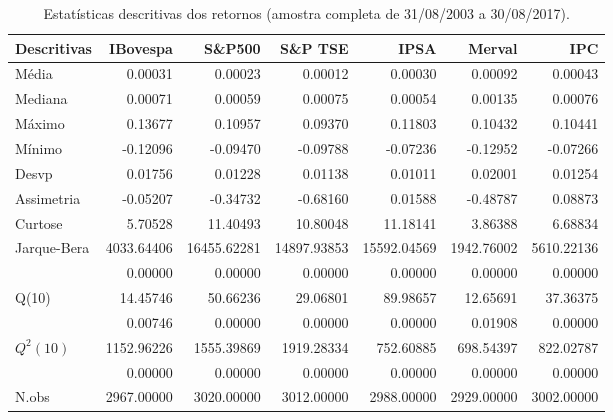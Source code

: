 \begin{table}[H]
\centering
\caption{Estatísticas descritivas dos retornos 
               (amostra completa de 31/08/2003 a 30/08/2017).} 
\label{tab:descritivas}
\begin{tabular}{lrrrrrr}
  \hline
Descritivas & IBovespa & S\&P500 & S\&P TSE & IPSA & Merval & IPC \\ 
  \hline
Média & 0.00031 & 0.00023 & 0.00012 & 0.00030 & 0.00092 & 0.00043 \\ 
  Mediana & 0.00071 & 0.00059 & 0.00075 & 0.00054 & 0.00135 & 0.00076 \\ 
  Máximo & 0.13677 & 0.10957 & 0.09370 & 0.11803 & 0.10432 & 0.10441 \\ 
  Mínimo & -0.12096 & -0.09470 & -0.09788 & -0.07236 & -0.12952 & -0.07266 \\ 
  Desvp & 0.01756 & 0.01228 & 0.01138 & 0.01011 & 0.02001 & 0.01254 \\ 
  Assimetria & -0.05207 & -0.34732 & -0.68160 & 0.01588 & -0.48787 & 0.08873 \\ 
  Curtose & 5.70528 & 11.40493 & 10.80048 & 11.18141 & 3.86388 & 6.68834 \\ 
  Jarque-Bera & 4033.64406 & 16455.62281 & 14897.93853 & 15592.04569 & 1942.76002 & 5610.22136 \\ 
   & 0.00000 & 0.00000 & 0.00000 & 0.00000 & 0.00000 & 0.00000 \\ 
  Q(10) & 14.45746 & 50.66236 & 29.06801 & 89.98657 & 12.65691 & 37.36375 \\ 
   & 0.00746 & 0.00000 & 0.00000 & 0.00000 & 0.01908 & 0.00000 \\ 
  $Q^2(10)$ & 1152.96226 & 1555.39869 & 1919.28334 & 752.60885 & 698.54397 & 822.02787 \\ 
   & 0.00000 & 0.00000 & 0.00000 & 0.00000 & 0.00000 & 0.00000 \\ 
  N.obs & 2967.00000 & 3020.00000 & 3012.00000 & 2988.00000 & 2929.00000 & 3002.00000 \\ 
   \hline
\end{tabular}
\end{table}
